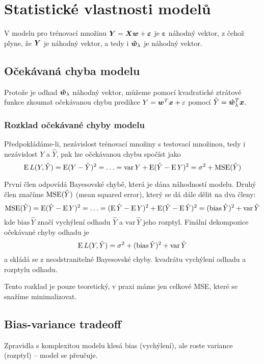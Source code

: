 \section{Statistické vlastnosti modelů}

V modelu pro trénovací množinu $\bm{Y} = \bm{X}\bm{w} + \bm{\varepsilon}$ je $\bm{\varepsilon}$ náhodný vektor, z čehož plyne, že $\bm{Y}$ je náhodný vektor, a tedy i $\bm{\hat{w}}_\lambda$ je náhodný vektor.

\subsection{Očekávaná chyba modelu}

Protože je odhad $\bm{\hat{w}}_\lambda$ náhodný vektor, můžeme pomocí kvadratické ztrátové funkce zkoumat očekávanou chybu predikce $Y = \bm{w}^T\bm{x} + \varepsilon$ pomocí $\hat{Y} = \bm{\hat{w}}_\lambda^T \bm{x}$.

\subsubsection{Rozklad očekávané chyby modelu}

Předpokládáme-li, nezávislost trénovací množiny s testovací množinou, tedy i nezávislost $Y$ a $\hat{Y}$, pak lze očekávanou chybu spočíst jako
\[
    \operatorname{E} L(Y, \hat{Y}) = \operatorname{E} (Y - \hat{Y})^2 = \ldots
    = \textrm{var}\,Y + \operatorname{E} (\hat{Y} - \operatorname{E} Y)^2
    = \sigma^2 + \operatorname{MSE}(\hat{Y})
\]

První člen odpovídá Bayesovské chybě, která je dána náhodností modelu. Druhý člen značíme $\operatorname{MSE}(\hat{Y})$ (mean squared error), který se dá dále dělit na dva členy:
\[
    \operatorname{MSE}(\hat{Y}) = \operatorname{E} (\hat{Y} - \operatorname{E} Y)^2 = \ldots
    = (\operatorname{E}\hat{Y} - \operatorname{E} Y)^2 + \operatorname{E}(\hat{Y} - \operatorname{E}\hat{Y})^2
    = (\text{bias}\,\hat{Y})^2 + \text{var}\,\hat{Y}
\]
kde $\text{bias}\,\hat{Y}$ značí vychýlení odhadu $\hat{Y}$ a $\text{var}\,\hat{Y}$ jeho rozptyl. Finální dekompozice očekávané chyby odhadu je
\[
    \operatorname{E} L(Y, \hat{Y}) = \sigma^2 + (\text{bias}\,\hat{Y})^2 + \text{var}\,\hat{Y}
\]
a skládá se z neodstranitelné Bayesovské chyby. kvadrátu vychýlení odhadu a rozptylu odhadu.

Tento rozklad je pouze teoretický, v praxi máme jen celkové MSE, které se snažíme minimalizovat.

\subsection{Bias-variance tradeoff}

Zpravidla s komplexitou modelu klesá bias (vychýlení), ale roste variance (rozptyl) -- model se přeučuje.

